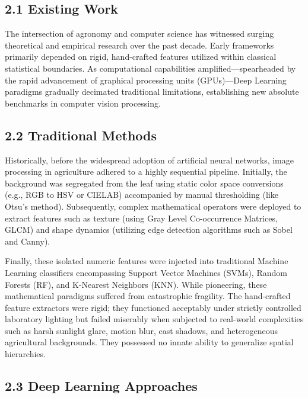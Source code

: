 \documentclass[
]{article}
\begin{document}
\subsection{2.1 Existing Work}\label{existing-work}

The intersection of agronomy and computer science has witnessed surging
theoretical and empirical research over the past decade. Early
frameworks primarily depended on rigid, hand-crafted features utilized
within classical statistical boundaries. As computational capabilities
amplified---spearheaded by the rapid advancement of graphical processing
units (GPUs)---Deep Learning paradigms gradually decimated traditional
limitations, establishing new absolute benchmarks in computer vision
processing.

\subsection{2.2 Traditional Methods}\label{traditional-methods}

Historically, before the widespread adoption of artificial neural
networks, image processing in agriculture adhered to a highly sequential
pipeline. Initially, the background was segregated from the leaf using
static color space conversions (e.g., RGB to HSV or CIELAB) accompanied
by manual thresholding (like Otsu's method). Subsequently, complex
mathematical operators were deployed to extract features such as texture
(using Gray Level Co-occurrence Matrices, GLCM) and shape dynamics
(utilizing edge detection algorithms such as Sobel and Canny).

Finally, these isolated numeric features were injected into traditional
Machine Learning classifiers encompassing Support Vector Machines
(SVMs), Random Forests (RF), and K-Nearest Neighbors (KNN). While
pioneering, these mathematical paradigms suffered from catastrophic
fragility. The hand-crafted feature extractors were rigid; they
functioned acceptably under strictly controlled laboratory lighting but
failed miserably when subjected to real-world complexities such as harsh
sunlight glare, motion blur, cast shadows, and heterogeneous
agricultural backgrounds. They possessed no innate ability to generalize
spatial hierarchies.

\subsection{2.3 Deep Learning
Approaches}\label{deep-learning-approaches}
\end{document}
